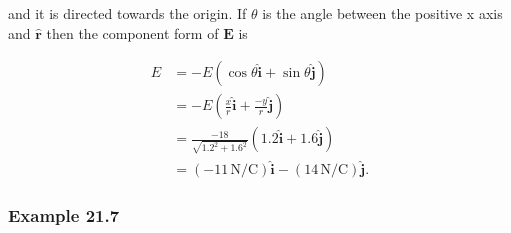 \documentclass{article}
\begin{document}
and it is directed towards the origin. If $\theta$ is the angle between the positive x axis and $\hat{\mathbf{r}}$ then the component form of $\mathbf{E}$ is

\begin{align*}
  E & = -E\left(\cos\theta\hat{\mathbf{i}} + \sin\theta\hat{\mathbf{j}}\right)                      \\
    & = -E\left(\frac{x}{r}\hat{\mathbf{i}} + \frac{-y}{r}\hat{\mathbf{j}}\right)                   \\
    & = \frac{-18}{\sqrt{1.2^2 + 1.6^2}}\left(1.2\hat{\mathbf{i}} + 1.6\hat{\mathbf{j}}\right)      \\
    & = (-11\,\textrm{N}/\textrm{C})\hat{\mathbf{i}} - (14\,\textrm{N}/\textrm{C})\hat{\mathbf{j}}.
\end{align*}

\subsubsection{Example 21.7}
\end{document}
